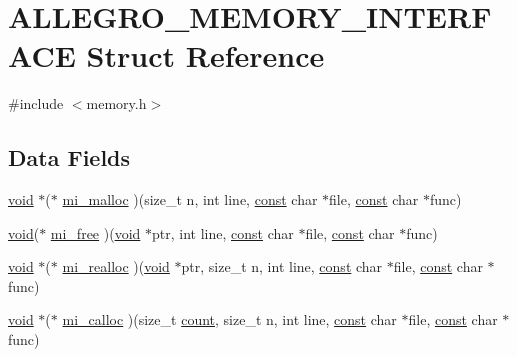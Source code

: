 \hypertarget{struct_a_l_l_e_g_r_o___m_e_m_o_r_y___i_n_t_e_r_f_a_c_e}{}\section{A\+L\+L\+E\+G\+R\+O\+\_\+\+M\+E\+M\+O\+R\+Y\+\_\+\+I\+N\+T\+E\+R\+F\+A\+CE Struct Reference}
\label{struct_a_l_l_e_g_r_o___m_e_m_o_r_y___i_n_t_e_r_f_a_c_e}


{\ttfamily \#include $<$memory.\+h$>$}

\subsection*{Data Fields}
\begin{DoxyCompactItemize}
\item 
\hyperlink{png_8h_ac9c84fa68bbad002983e35ce3663c686}{void} $\ast$($\ast$ \hyperlink{struct_a_l_l_e_g_r_o___m_e_m_o_r_y___i_n_t_e_r_f_a_c_e_af9c5b17421e98f7415486bac52cbd487}{mi\+\_\+malloc} )(size\+\_\+t n, int line, \hyperlink{zconf_8h_a2c212835823e3c54a8ab6d95c652660e}{const} char $\ast$file, \hyperlink{zconf_8h_a2c212835823e3c54a8ab6d95c652660e}{const} char $\ast$func)
\item 
\hyperlink{png_8h_ac9c84fa68bbad002983e35ce3663c686}{void}($\ast$ \hyperlink{struct_a_l_l_e_g_r_o___m_e_m_o_r_y___i_n_t_e_r_f_a_c_e_a4fc0ccc54ec59996adc3c2b45512c4b9}{mi\+\_\+free} )(\hyperlink{png_8h_ac9c84fa68bbad002983e35ce3663c686}{void} $\ast$ptr, int line, \hyperlink{zconf_8h_a2c212835823e3c54a8ab6d95c652660e}{const} char $\ast$file, \hyperlink{zconf_8h_a2c212835823e3c54a8ab6d95c652660e}{const} char $\ast$func)
\item 
\hyperlink{png_8h_ac9c84fa68bbad002983e35ce3663c686}{void} $\ast$($\ast$ \hyperlink{struct_a_l_l_e_g_r_o___m_e_m_o_r_y___i_n_t_e_r_f_a_c_e_a0ff03db35efec30eec7d1dd55bb9c831}{mi\+\_\+realloc} )(\hyperlink{png_8h_ac9c84fa68bbad002983e35ce3663c686}{void} $\ast$ptr, size\+\_\+t n, int line, \hyperlink{zconf_8h_a2c212835823e3c54a8ab6d95c652660e}{const} char $\ast$file, \hyperlink{zconf_8h_a2c212835823e3c54a8ab6d95c652660e}{const} char $\ast$func)
\item 
\hyperlink{png_8h_ac9c84fa68bbad002983e35ce3663c686}{void} $\ast$($\ast$ \hyperlink{struct_a_l_l_e_g_r_o___m_e_m_o_r_y___i_n_t_e_r_f_a_c_e_aac824232a661735f00411186867422f2}{mi\+\_\+calloc} )(size\+\_\+t \hyperlink{_core_8c_ad43c3812e6d13e0518d9f8b8f463ffcf}{count}, size\+\_\+t n, int line, \hyperlink{zconf_8h_a2c212835823e3c54a8ab6d95c652660e}{const} char $\ast$file, \hyperlink{zconf_8h_a2c212835823e3c54a8ab6d95c652660e}{const} char $\ast$func)
\end{DoxyCompactItemize}


